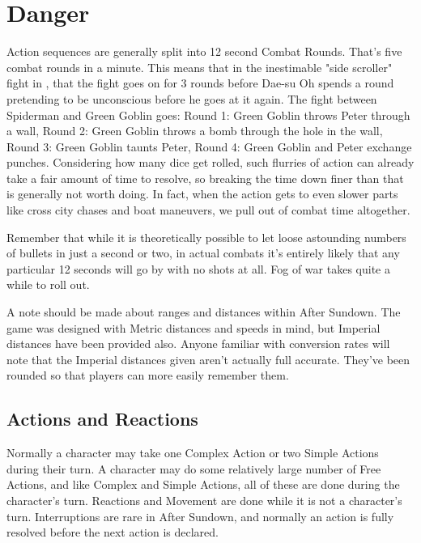 \chapter{Danger}

Action sequences are generally split into 12 second Combat Rounds. That's five combat rounds in a minute. This means that in the inestimable "side scroller" fight in , that the fight goes on for 3 rounds before Dae-su Oh spends a round pretending to be unconscious before he goes at it again. The fight between Spiderman and Green Goblin goes: Round 1: Green Goblin throws Peter through a wall, Round 2: Green Goblin throws a bomb through the hole in the wall, Round 3: Green Goblin taunts Peter, Round 4: Green Goblin and Peter exchange punches. Considering how many dice get rolled, such flurries of action can already take a fair amount of time to resolve, so breaking the time down finer than that is generally not worth doing. In fact, when the action gets to even slower parts like cross city chases and boat maneuvers, we pull out of combat time altogether.

Remember that while it is theoretically possible to let loose astounding numbers of bullets in just a second or two, in actual combats it's entirely likely that any particular 12 seconds will go by with no shots at all. Fog of war takes quite a while to roll out.

A note should be made about ranges and distances within After Sundown. The game was designed with Metric distances and speeds in mind, but Imperial distances have been provided also. Anyone familiar with conversion rates will note that the Imperial distances given aren't actually full accurate. They've been rounded so that players can more easily remember them.

\section{Actions and Reactions}

\hspace{\parindent} Normally a character may take one Complex Action or two Simple Actions during their turn. A character may do some relatively large number of Free Actions, and like Complex and Simple Actions, all of these are done during the character's turn. Reactions and Movement are done while it is not a character's turn. Interruptions are rare in After Sundown, and normally an action is fully resolved before the next action is declared.


